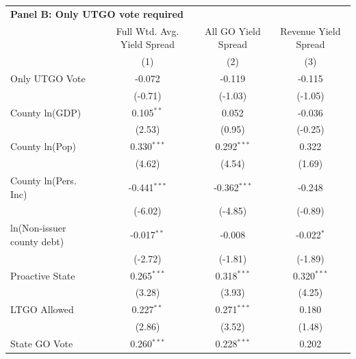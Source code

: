 \begingroup
\centering
\begin{tabular*}{\textwidth}{@{\extracolsep{\fill}}lccc}
\multicolumn{4}{l}{\textbf{Panel B: Only UTGO vote required}}\\

\addlinespace
   \toprule
                              & Full Wtd. Avg. Yield Spread & All GO Yield Spread & Revenue Yield Spread\\  
                              & (1)                         & (2)                 & (3)\\  
   \midrule 
   Only UTGO Vote             & -0.072                      & -0.119              & -0.115\\   
                              & (-0.71)                    & (-1.03)            & (-1.05)\\   
   County ln(GDP)             & 0.105$^{**}$                & 0.052               & -0.036\\   
                              & (2.53)                     & (0.95)             & (-0.25)\\   
   County ln(Pop)             & 0.330$^{***}$               & 0.292$^{***}$       & 0.322\\   
                              & (4.62)                     & (4.54)             & (1.69)\\   
   County ln(Pers. Inc)       & -0.441$^{***}$              & -0.362$^{***}$      & -0.248\\   
                              & (-6.02)                    & (-4.85)            & (-0.89)\\   
   ln(Non-issuer county debt) & -0.017$^{**}$               & -0.008              & -0.022$^{*}$\\   
                              & (-2.72)                    & (-1.81)            & (-1.89)\\   
   Proactive State            & 0.265$^{***}$               & 0.318$^{***}$       & 0.320$^{***}$\\   
                              & (3.28)                     & (3.93)             & (4.25)\\   
   LTGO Allowed               & 0.227$^{**}$                & 0.271$^{***}$       & 0.180\\   
                              & (2.86)                     & (3.52)             & (1.48)\\   
   State GO Vote              & 0.260$^{***}$               & 0.228$^{***}$       & 0.202\\   

\end{tabular*}
